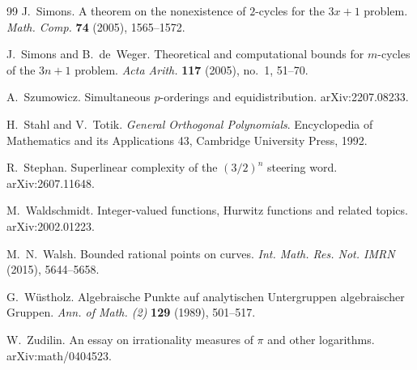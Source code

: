\documentclass[10pt,letterpaper]{article}
\begin{document}
\begin{thebibliography}{99}
J.~Simons.
\newblock A theorem on the nonexistence of $2$-cycles for the $3x+1$ problem.
\newblock \emph{Math. Comp.} \textbf{74} (2005), 1565--1572.

J.~Simons and B.~de~Weger.
\newblock Theoretical and computational bounds for $m$-cycles of the $3n+1$ problem.
\newblock \emph{Acta Arith.} \textbf{117} (2005), no.~1, 51--70.

A.~Szumowicz.
\newblock Simultaneous $p$-orderings and equidistribution.
\newblock arXiv:2207.08233.

H.~Stahl and V.~Totik.
\newblock \emph{General Orthogonal Polynomials}.
\newblock Encyclopedia of Mathematics and its Applications 43, Cambridge University Press, 1992.

R.~Stephan.
\newblock Superlinear complexity of the $(3/2)^n$ steering word.
\newblock arXiv:2607.11648.

M.~Waldschmidt.
\newblock Integer-valued functions, Hurwitz functions and related topics.
\newblock arXiv:2002.01223.

M.~N.~Walsh.
\newblock Bounded rational points on curves.
\newblock \emph{Int. Math. Res. Not. IMRN} (2015), 5644--5658.

G.~W\"ustholz.
\newblock Algebraische Punkte auf analytischen Untergruppen algebraischer Gruppen.
\newblock \emph{Ann. of Math. (2)} \textbf{129} (1989), 501--517.

W.~Zudilin.
\newblock An essay on irrationality measures of $\pi$ and other logarithms.
\newblock arXiv:math/0404523.

\end{thebibliography}
\endgroup
\end{document}
